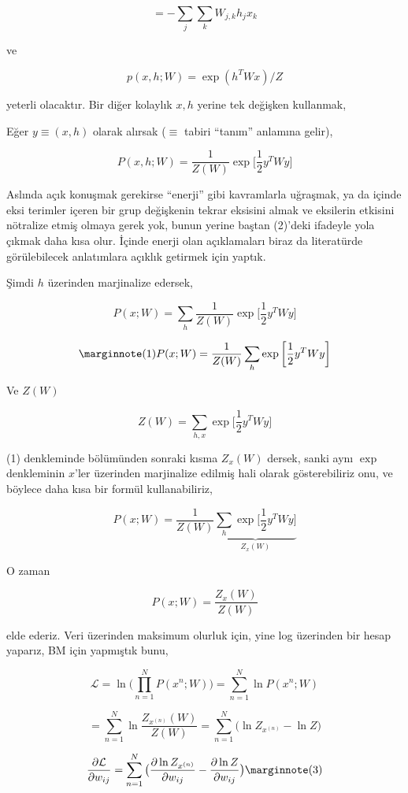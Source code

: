 \documentclass[12pt,fleqn]{article}\usepackage{../../common}
\begin{document}
$$ = - \sum_j \sum_k W_{j,k}h_jx_k  $$

ve

$$ p(x,h;W)  = \exp (h^TWx) / Z $$

yeterli olacaktır. Bir diğer kolaylık $x,h$ yerine tek değişken kullanmak,

Eğer $y \equiv (x,h)$ olarak alırsak ($\equiv$ tabiri ``tanım'' anlamına gelir), 


$$ P(x,h;W) = \frac{1}{Z(W)} \exp 
\bigg[ 
\frac{1}{2} y^T W y
\bigg]
$$

Aslında açık konuşmak gerekirse ``enerji'' gibi kavramlarla uğraşmak, ya da
içinde eksi terimler içeren bir grup değişkenin tekrar eksisini almak ve
eksilerin etkisini nötralize etmiş olmaya gerek yok, bunun yerine baştan
(2)'deki ifadeyle yola çıkmak daha kısa olur. İçinde enerji olan
açıklamaları biraz da literatürde görülebilecek anlatımlara açıklık
getirmek için yaptık.

Şimdi $h$ üzerinden marjinalize edersek,

$$ P(x;W) = \sum_h \frac{1}{Z(W)} \exp 
\bigg[ 
\frac{1}{2} y^T W y
\bigg]
$$


$$  
\mlabel{1}
P(x;W) = \frac{1}{Z(W)}  \sum_h \exp 
\bigg[ 
\frac{1}{2} y^T W y
\bigg]
$$


Ve $Z(W)$ 

$$ Z(W) = \sum_{h,x} \exp 
\bigg[ 
\frac{1}{2} y^T W y
\bigg]
$$

(1) denkleminde bölümünden sonraki kısma $Z_x(W)$ dersek, sanki aynı $\exp$
denkleminin $x$'ler üzerinden marjinalize edilmiş hali olarak
gösterebiliriz onu, ve böylece daha kısa bir formül kullanabiliriz,

$$  
P(x;W) = \frac{1}{Z(W)}  
\underbrace{
\sum_h \exp 
\bigg[ 
\frac{1}{2} y^T W y
\bigg]
}_{Z_x(W)}
$$

O zaman 

$$  
P(x;W) = \frac{Z_x(W)}{Z(W)} 
$$

elde ederiz. Veri üzerinden maksimum olurluk için, yine log üzerinden bir
hesap yaparız, BM için yapmıştık bunu,

$$  
\mathcal{L} = 
\ln \big( \prod_{n=1}^{N} P(x^{n};W) \big) = 
\sum_{n=1}^{N} \ln P(x^{n};W) 
$$

$$ 
= \sum_{n=1}^{N} \ln \frac{Z_{x^{(n)}}(W)}{Z(W)}  
= \sum_{n=1}^{N}  \big(\ln Z_{x^{(n)}} - \ln Z \big) 
$$

$$ 
\frac{\partial \mathcal{L} }{\partial w_{ij}} = 
\sum_{n=1}^{N}  \big( \frac{\partial \ln Z_{x^{(n)}} }{\partial w_{ij}}
- \frac{\partial \ln Z }{\partial w_{ij}} \big)
\mlabel{3}
$$
\end{document}
